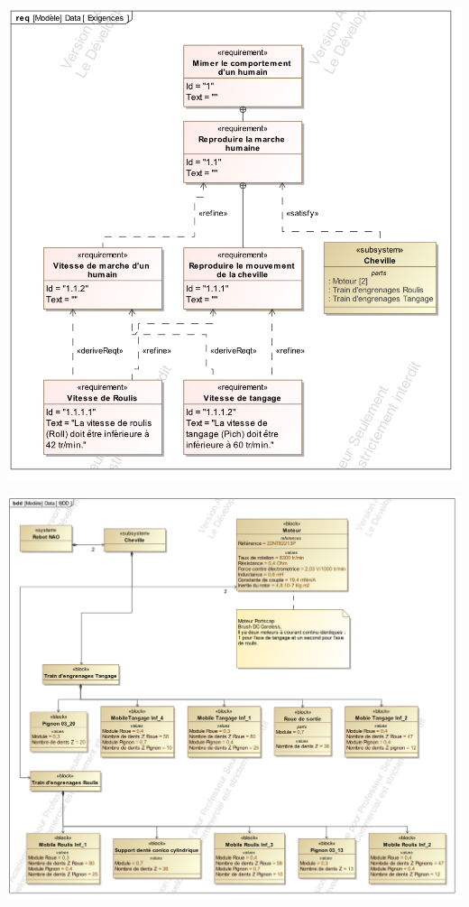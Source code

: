 \documentclass[10pt,fleqn]{article} %
\begin{document}
\begin{multicols}{2}
\ifprof
\else

\begin{center}
\includegraphics[width=\linewidth]{images/Req}
\end{center}
\begin{center}
\includegraphics[width=\linewidth]{images/BDD}
\end{center}


\end{multicols}
\end{document}
